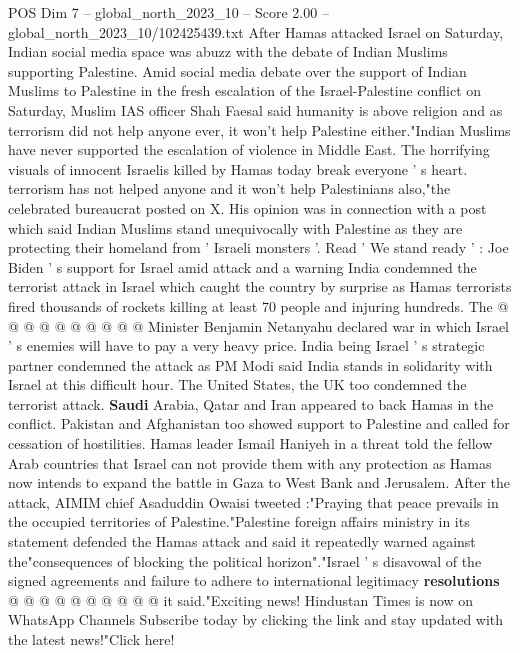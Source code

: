 \begin{textsample}{POS Dim 7 – global\_north\_2023\_10 – Score 2.00 – global\_north\_2023\_10/102425439.txt}  \label{ex:f7_pos_426}
After Hamas attacked Israel on Saturday, Indian social media space was abuzz with the debate of Indian Muslims supporting Palestine.
Amid social media debate over the support of Indian Muslims to Palestine in the fresh escalation of the Israel-Palestine conflict on Saturday, Muslim IAS officer Shah Faesal said humanity is above religion and as terrorism did not help anyone ever, it won't help Palestine either."Indian Muslims have never supported the escalation of violence in Middle East.
The horrifying visuals of innocent Israelis killed by Hamas today break everyone ' s heart. terrorism has not helped anyone and it won't help Palestinians also,"the celebrated bureaucrat posted on X.
His opinion was in connection with a post which said Indian Muslims stand unequivocally with Palestine as they are protecting their homeland from ' Israeli monsters '.
Read ' We stand ready ' : Joe Biden ' s support for Israel amid attack and a warning India condemned the terrorist attack in Israel which caught the country by surprise as Hamas terrorists fired thousands of rockets killing at least 70 people and injuring hundreds.
The @ @ @ @ @ @ @ @ @ @ Minister Benjamin Netanyahu declared war in which Israel ' s enemies will have to pay a very heavy price.
India being Israel ' s strategic partner condemned the attack as PM Modi said India stands in solidarity with Israel at this difficult hour.
The United States, the UK too condemned the terrorist attack. \textbf{Saudi} Arabia, Qatar and Iran appeared to back Hamas in the conflict.
Pakistan and Afghanistan too showed support to Palestine and called for cessation of hostilities.
Hamas leader Ismail Haniyeh in a threat told the fellow Arab countries that Israel can not provide them with any protection as Hamas now intends to expand the battle in Gaza to West Bank and Jerusalem.
After the attack, AIMIM chief Asaduddin Owaisi tweeted :"Praying that peace prevails in the occupied territories of Palestine."Palestine foreign affairs ministry in its statement defended the Hamas attack and said it repeatedly warned against the"consequences of blocking the political horizon"."Israel ' s disavowal of the signed agreements and failure to adhere to international legitimacy \textbf{resolutions} @ @ @ @ @ @ @ @ @ @ it said."Exciting news!
Hindustan Times is now on WhatsApp Channels Subscribe today by clicking the link and stay updated with the latest news!"Click here!

\end{textsample}
